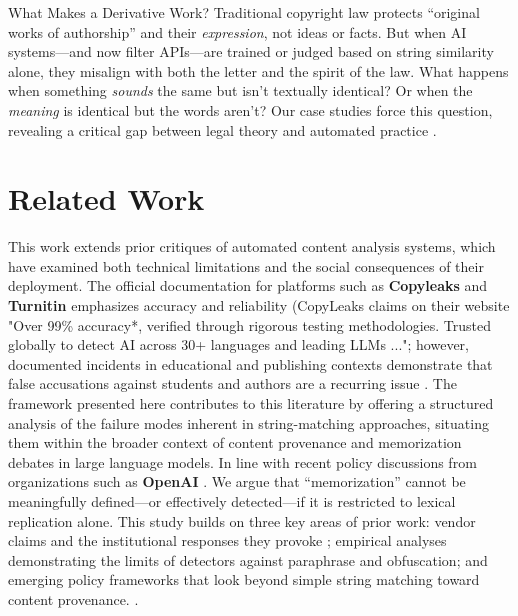 \documentclass[12pt]{article}
\begin{document}
\begin{sidebar}{What Makes a Derivative Work?}
Traditional copyright law protects “original works of authorship” and their \emph{expression}, not ideas or facts. But when AI systems—and now filter APIs—are trained or judged based on string similarity alone, they misalign with both the letter and the spirit of the law. What happens when something \emph{sounds} the same but isn’t textually identical? Or when the \emph{meaning} is identical but the words aren’t? Our case studies force this question, revealing a critical gap between legal theory and automated practice \cite{copyright-circular1,copyright-derivative-work}.
\end{sidebar}

\section{Related Work}
This work extends prior critiques of automated content analysis systems, which have examined both technical limitations and the social consequences of their deployment. The official documentation for platforms such as \textbf{Copyleaks} and \textbf{Turnitin} emphasizes accuracy and reliability (CopyLeaks claims on their website "Over 99\% accuracy*, verified through rigorous testing methodologies. Trusted globally to detect AI across 30+ languages and leading LLMs ..."; however, documented incidents in educational and publishing contexts demonstrate that false accusations against students and authors are a recurring issue \cite{turnitin-fp,vanderbilt-turnitin-disabled}. The framework presented here contributes to this literature by offering a structured analysis of the failure modes inherent in string-matching approaches, situating them within the broader context of content provenance and memorization debates in large language models. In line with recent policy discussions from organizations such as \textbf{OpenAI} \cite{pai-synthetic-media}.  We argue that “memorization” cannot be meaningfully defined—or effectively detected—if it is restricted to lexical replication alone. This study builds on three key areas of prior work: vendor claims and the institutional responses they provoke \cite{copyleaks-claim,turnitin-fp,vanderbilt-turnitin-disabled}; empirical analyses demonstrating the limits of detectors against paraphrase and obfuscation\cite{pan2014-overview,barron-cedeno-2013,weber-wulff-2023}; and emerging policy frameworks that look beyond simple string matching toward content provenance. \cite{c2pa,pai-synthetic-media}.
\end{document}

